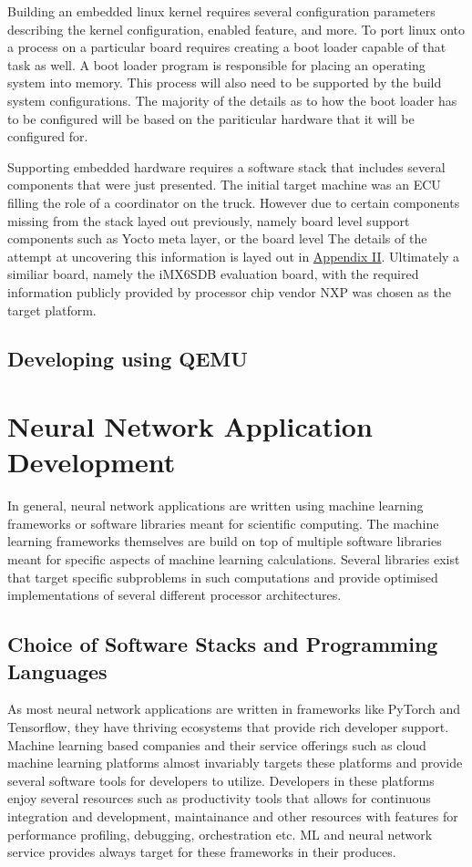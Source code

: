 Building an embedded linux kernel requires several configuration parameters describing the kernel configuration, enabled feature, and more. To port linux onto a process on a particular board requires creating a boot loader capable of that task as well. A boot loader program is responsible for placing an operating system into memory. This process will also need to be supported by the build system configurations. The majority of the details as to how the boot loader has to be configured will be based on the pariticular hardware that it will be configured for.

Supporting embedded hardware requires a software stack that includes several components that were just presented. The initial target machine was an ECU filling the role of a coordinator on the truck. However due to certain components missing from the stack layed out previously, namely board level support components such as Yocto meta layer, or the board level The details of the attempt at uncovering this information is layed out in \hyperref[rtc-c300]{Appendix II}. Ultimately a similiar board, namely the iMX6SDB evaluation board, with the required information publicly provided by processor chip vendor NXP was chosen as the target platform.

\subsection{Developing using QEMU}

\section{Neural Network Application Development}

In general, neural network applications are written using machine learning frameworks or software libraries meant for scientific computing. The machine learning frameworks themselves are build on top of multiple software libraries meant for specific aspects of machine learning calculations. Several libraries exist that target specific subproblems in such computations and provide optimised implementations of several different processor architectures.

\subsection{Choice of Software Stacks and Programming Languages}

As most neural network applications are written in frameworks like PyTorch and Tensorflow, they have thriving ecosystems that provide rich developer support. Machine learning based companies and their service offerings such as cloud machine learning platforms almost invariably targets these platforms and provide several software tools for developers to utilize. Developers in these platforms enjoy several resources such as productivity tools that allows for continuous integration and development, maintainance and other resources with features for performance profiling, debugging, orchestration etc. ML and neural network service provides always target for these frameworks in their produces.


